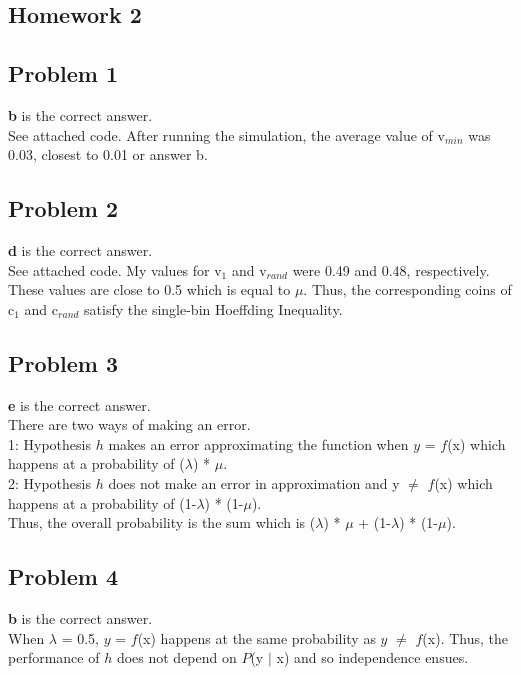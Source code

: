 \documentclass[12 pt]{article}
\begin{document}
	\begin{center}
		\section*{Homework 2}
	\end{center}
	\subsection*{Problem 1}
	
	\textbf{b} is the correct answer. \\
	See attached code. After running the simulation, the average value of v$_{min}$ was 0.03, closest to 0.01 or answer b.
	
	
	\subsection*{Problem 2}
	
	\textbf{d} is the correct answer. \\
	See attached code. My values for v$_1$ and v$_{rand}$ were 0.49 and 0.48, respectively. These values are close to 0.5 which is equal to $\mu$. Thus, the corresponding coins of c$_1$ and c$_{rand}$ satisfy the single-bin Hoeffding Inequality.
	
	\subsection*{Problem 3}
	\textbf{e} is the correct answer.\\
	There are two ways of making an error. \\1: Hypothesis $h$ makes an error approximating the function when $y$ = $f$(x) which happens at a probability of ($\lambda$) * $\mu$. \\2: Hypothesis $h$ does not make an error in approximation and y $\neq$ $f$(x) which happens at a probability of (1-$\lambda$) * (1-$\mu$).\\
	Thus, the overall probability is the sum which is ($\lambda$) * $\mu$ + (1-$\lambda$) * (1-$\mu$).
	
	\subsection*{Problem 4}
	\textbf{b} is the correct answer.\\
	When $\lambda$ = 0.5, $y$ = $f$(x) happens at the same probability as $y$ $\neq$ $f$(x). Thus, the performance of $h$ does not depend on $P$(y $|$ x) and so independence ensues. 
\end{document}
